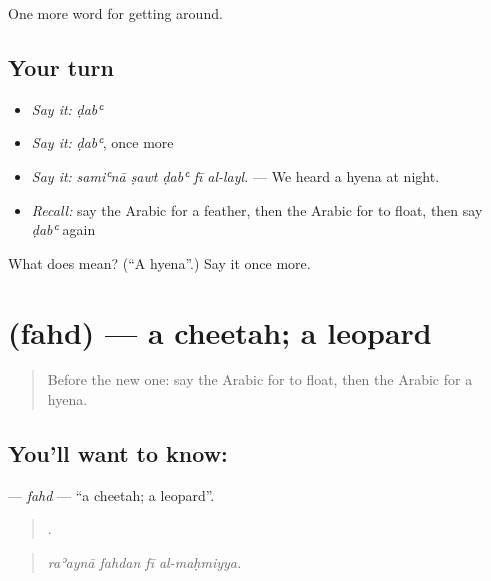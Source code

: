 \begin{grammarlens}[title={What you've built}]
One more word for getting around.
\end{grammarlens}

\subsection*{Your turn}
\begin{itemize}
\raggedright
  \item \emph{Say it:} \emph{ḍabʿ}
  \item \emph{Say it:} \emph{ḍabʿ}, once more
  \item \emph{Say it:} \emph{samiʿnā ṣawt ḍabʿ fī al-layl.} — We heard a hyena at night.
  \item \emph{Recall:} say the Arabic for a feather, then the Arabic for to float, then say \emph{ḍabʿ} again
\end{itemize}

\begin{tcolorbox}[breakable,colback=teal!4,colframe=teal!35!black,title={Before you move on}]
What does  mean? (\textquotedblleft{}A hyena\textquotedblright{}.) Say it once more.
\end{tcolorbox}
\section[\texorpdfstring{\ar{فهد} (fahd)}{فهد (fahd)}]{ (fahd) — a cheetah; a leopard}

\label{lesson:AR-C475-fahd}



\begin{quote}
Before the new one: say the Arabic for to float, then the Arabic for a hyena.
\end{quote}

\subsection*{You'll want to know: }
\textbf{} — \emph{fahd} — \textquotedblleft{}a cheetah; a leopard\textquotedblright{}.

\begin{quote}
   .
\end{quote}

\begin{quote}
\emph{raʾaynā fahdan fī al-maḥmiyya.}
\end{quote}

